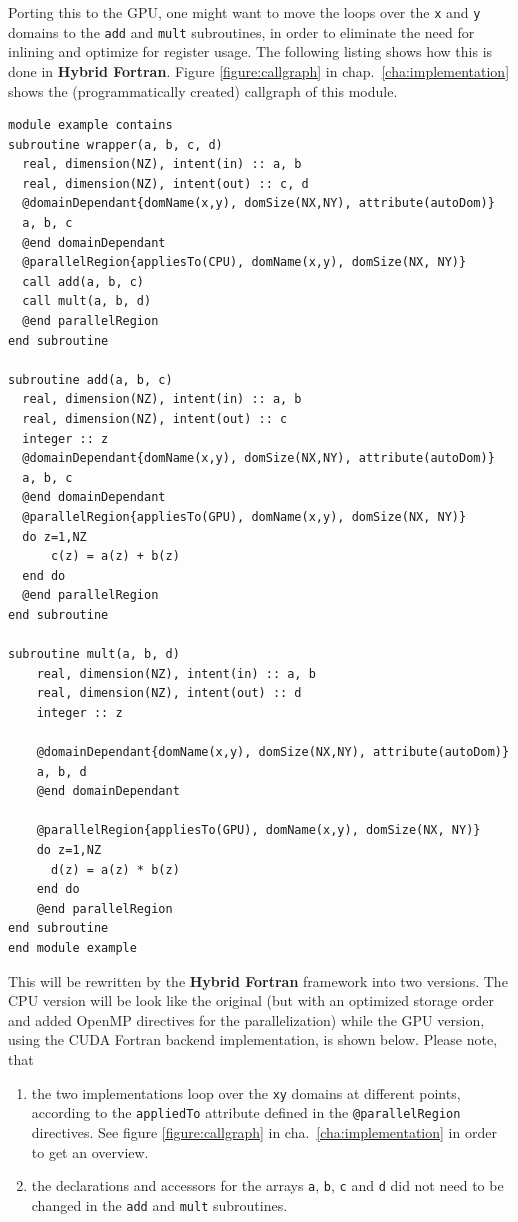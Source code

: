 Porting this to the GPU, one might want to move the loops over the \verb|x| and \verb|y| domains to the \verb|add| and \verb|mult| subroutines, in order to eliminate the need for inlining and optimize for register usage. The following listing shows how this is done in \textbf{Hybrid Fortran}. Figure \ref{figure:callgraph} in chap.~\ref{cha:implementation} shows the (programmatically created) callgraph of this module.

\begin{lstlisting}[name=example, label=listing:example, caption={example of a Hybrid Fortran subroutine with a parallel region}]
module example contains
subroutine wrapper(a, b, c, d)
  real, dimension(NZ), intent(in) :: a, b
  real, dimension(NZ), intent(out) :: c, d
  @domainDependant{domName(x,y), domSize(NX,NY), attribute(autoDom)}
  a, b, c
  @end domainDependant
  @parallelRegion{appliesTo(CPU), domName(x,y), domSize(NX, NY)}
  call add(a, b, c)
  call mult(a, b, d)
  @end parallelRegion
end subroutine

subroutine add(a, b, c)
  real, dimension(NZ), intent(in) :: a, b
  real, dimension(NZ), intent(out) :: c
  integer :: z
  @domainDependant{domName(x,y), domSize(NX,NY), attribute(autoDom)}
  a, b, c
  @end domainDependant
  @parallelRegion{appliesTo(GPU), domName(x,y), domSize(NX, NY)}
  do z=1,NZ
      c(z) = a(z) + b(z)
  end do
  @end parallelRegion
end subroutine

subroutine mult(a, b, d)
    real, dimension(NZ), intent(in) :: a, b
    real, dimension(NZ), intent(out) :: d
    integer :: z

    @domainDependant{domName(x,y), domSize(NX,NY), attribute(autoDom)}
    a, b, d
    @end domainDependant

    @parallelRegion{appliesTo(GPU), domName(x,y), domSize(NX, NY)}
    do z=1,NZ
      d(z) = a(z) * b(z)
    end do
    @end parallelRegion
end subroutine
end module example
\end{lstlisting}

This will be rewritten by the \textbf{Hybrid Fortran} framework into two versions. The CPU version will be look like the original (but with an optimized storage order and added OpenMP directives for the parallelization) while the GPU version, using the CUDA Fortran backend implementation, is shown below. Please note, that
\begin{enumerate}
 \item the two implementations loop over the \verb|xy| domains at different points, according to the \verb|appliedTo| attribute defined in the \verb|@parallelRegion| directives. See figure \ref{figure:callgraph} in cha.~\ref{cha:implementation} in order to get an overview.
 \item the declarations and accessors for the arrays \verb|a|, \verb|b|, \verb|c| and \verb|d| did not need to be changed in the \verb|add| and \verb|mult| subroutines.
\end{enumerate}

